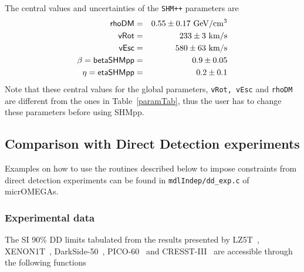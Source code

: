 \documentclass[12pt,a4paper]{article}
\begin{document}
The central values  and uncertainties   of   the {\tt SHM++} parameters are  
\begin{eqnarray}
\nonumber 
\textsf{rhoDM} &=&0.55\pm 0.17 ~{\rm GeV}/{\rm cm}^3\\
\nonumber
\textsf{vRot}&=& 233\pm 3 ~{\rm km/s}\\
\nonumber
\textsf{vEsc}&=& 580\pm 63~ {\rm km/s}\\
\nonumber
 \beta=\textsf{betaSHMpp} &=&0.9\pm 0.05\\
\eta= \textsf{etaSHMpp} &=& 0.2\pm 0.1 
\label{eq:SHMpp} 
\end{eqnarray}
\noindent
Note that these central values for the global parameters, {\tt vRot, vEsc} and {\tt rhoDM}   
are different from  the  ones in Table~\ref{paramTab}, thus the user has  to change these parameters before  using SHMpp.
 






\subsection{Comparison with Direct Detection experiments} 
\label{DDexp}

Examples on how to use the routines described below to impose constraints from direct detection experiments  can be found  in \verb|mdlIndep/dd_exp.c| of micrOMEGAs. 
\subsubsection{Experimental data}

The SI 90\%  DD  limits  tabulated from the results presented by LZ5T~\cite{Aalbers_2025}, XENON1T~\cite{Aprile:2018dbl}, DarkSide-50~\cite{Agnes:2018ves}, PICO-60~\cite{Amole:2019fdf}  and CRESST-III~\cite{Abdelhameed:2019hmk}  are accessible through  the following functions \\
\end{document}
